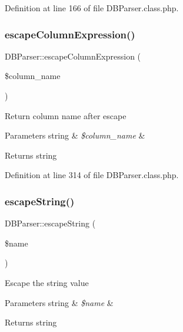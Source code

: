 Definition at line 166 of file D\+B\+Parser.\+class.\+php.

\hypertarget{classDBParser_a98416a358e6b2647d03d967b28a11504}{}\label{classDBParser_a98416a358e6b2647d03d967b28a11504} 
\subsubsection{\texorpdfstring{escape\+Column\+Expression()}{escapeColumnExpression()}}
{\footnotesize\ttfamily D\+B\+Parser\+::escape\+Column\+Expression (\begin{DoxyParamCaption}\item[{}]{\$column\+\_\+name }\end{DoxyParamCaption})}

Return column name after escape 
\begin{DoxyParams}[1]{Parameters}
string & {\em \$column\+\_\+name} & \\
\hline
\end{DoxyParams}
\begin{DoxyReturn}{Returns}
string 
\end{DoxyReturn}


Definition at line 314 of file D\+B\+Parser.\+class.\+php.

\hypertarget{classDBParser_acf60e21d6407197af743d97bc9158325}{}\label{classDBParser_acf60e21d6407197af743d97bc9158325} 
\subsubsection{\texorpdfstring{escape\+String()}{escapeString()}}
{\footnotesize\ttfamily D\+B\+Parser\+::escape\+String (\begin{DoxyParamCaption}\item[{}]{\$name }\end{DoxyParamCaption})}

Escape the string value


\begin{DoxyParams}[1]{Parameters}
string & {\em \$name} & \\
\hline
\end{DoxyParams}
\begin{DoxyReturn}{Returns}
string 
\end{DoxyReturn}



